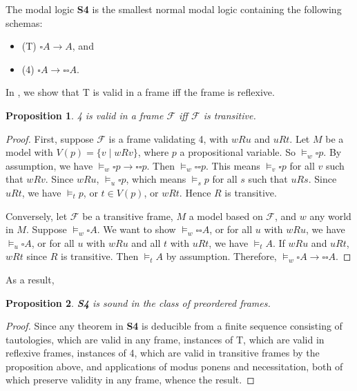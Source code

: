 \documentclass[12pt]{article}
\newtheorem{prop}{Proposition}
\begin{document}
The modal logic \textbf{S4} is the smallest normal modal logic containing the following schemas:
\begin{itemize}
\item (T) $\square A \to A$, and
\item (4) $\square A \to \square \square A$.
\end{itemize}
In , we show that T is valid in a frame iff the frame is reflexive.

\begin{prop} 4 is valid in a frame $\mathcal{F}$ iff $\mathcal{F}$ is transitive. \end{prop}
\begin{proof}  First, suppose $\mathcal{F}$ is a frame validating 4, with $w R u$ and $u R t$.  Let $M$ be a model with $V(p)=\lbrace v\mid w R v \rbrace$, where $p$ a propositional variable.  So $\models_w \square p$.  By assumption, we have $\models_w \square p \to \square \square p$.  Then $\models_w \square \square p$.  This means $\models_v \square p$ for all $v$ such that $w R v$.  Since $w R u$, $\models_u \square p$, which means $\models_s p$ for all $s$ such that $u R s$.  Since $u R t$, we have $\models_t p$, or $t\in V(p)$, or $w R t$.  Hence $R$ is transitive.

Conversely, let $\mathcal{F}$ be a transitive frame, $M$ a model based on $\mathcal{F}$, and $w$ any world in $M$.  Suppose $\models_w \square A$.  We want to show $\models_w \square \square A$, or for all $u$ with $w R u$, we have $\models_u \square A$, or for all $u$ with $w R u$ and all $t$ with $u R t$, we have $\models_t A$.  If $w R u$ and $u R t$, $w R t$ since $R$ is transitive.  Then $\models_t A$ by assumption.  Therefore, $\models_w \square A \to \square \square A$.
\end{proof}

As a result,
\begin{prop} \textbf{S4} is sound in the class of preordered frames. \end{prop}
\begin{proof}  Since any theorem in \textbf{S4} is deducible from a finite sequence consisting of tautologies, which are valid in any frame, instances of T, which are valid in reflexive frames, instances of 4, which are valid in transitive frames by the proposition above, and applications of modus ponens and necessitation, both of which preserve validity in any frame, whence the result.
\end{proof}
\end{document}
